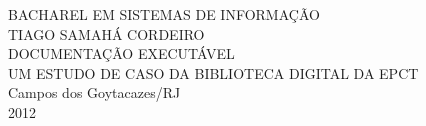 \begin{titlepage}
 \begin{figure}[ht]
 \centering
 \end{figure}
 \begin{center}
   {\large BACHAREL EM SISTEMAS DE INFORMAÇÃO} \\ [3.5cm]
   {\large TIAGO SAMAHÁ CORDEIRO} \\ [4cm]
   {\large DOCUMENTAÇÃO EXECUTÁVEL} \\ [0.5cm]
   {\small UM ESTUDO DE CASO DA BIBLIOTECA DIGITAL DA EPCT} \\
   \vfill
   {\large Campos dos Goytacazes/RJ} \\
   {\large 2012}
 \end{center}
\end{titlepage}